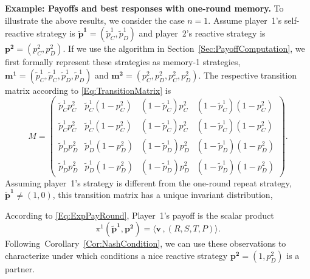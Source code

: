 \documentclass[9pt,twoside,lineno]{pnas-new}
\theoremstyle{plainCl1}
\theoremstyle{plainCl2}
\begin{document}
\noindent
{\bf Example: Payoffs and best responses with one-round memory.}
To illustrate the above results, we consider the case $n\!=\!1$. 
Assume player~1's self-reactive strategy is $\mathbf{\tilde p^1} \!=\! (\tilde p_C^1, \tilde p_D^1)$ and player~2's reactive strategy is $\mathbf{p^2} \!=\! (p^2_C, p^2_D)$. 
If we use the algorithm in Section~\ref{Sec:PayoffComputation}, we first formally represent these strategies as memory-1 strategies, $\mathbf{m^1} = (\tilde p_C^1, \tilde p_C^1,  \tilde p_D^1,  \tilde p_D^1)$ and $\mathbf{m^2} = (p_C^2, p_D^2,  p_C^2,  p_D^2)$.
The respective transition matrix according to \eqref{Eq:TransitionMatrix} is
\begin{equation} \label{Eq:TransitionM1}
M=\left(
\begin{array}{cccc}
\tilde p^1_C p^2_C	&\tilde p^1_C(1\!-\!p^2_C)	&(1\!-\!\tilde p^1_C)p^2_C	&(1\!-\!\tilde p^1_C)(1\!-\!p^2_C)\\
\tilde p^1_C p^2_C	&\tilde p^1_C(1\!-\!p^2_C)	&(1\!-\!\tilde p^1_C)p^2_C	&(1\!-\!\tilde p^1_C)(1\!-\!p^2_C)\\
\tilde p^1_D p^2_D	&\tilde p^1_D(1\!-\!p^2_D)	&(1\!-\!\tilde p^1_D)p^2_D	&(1\!-\!\tilde p^1_D)(1\!-\!p^2_D)\\
\tilde p^1_D p^2_D	&\tilde p^1_D(1\!-\!p^2_D)	&(1\!-\!\tilde p^1_D)p^2_D	&(1\!-\!\tilde p^1_D)(1\!-\!p^2_D)
\end{array}
\right).
\end{equation}
Assuming player~1's strategy is different from the one-round repeat strategy, $\mathbf{\tilde p^1} \!\neq\! (1,0)$, this transition matrix has a unique invariant distribution,
{\begin{center}
\end{center}}
\noindent
According to \eqref{Eq:ExpPayRound}, Player~1's payoff is the scalar product 
\begin{equation} \label{Eq:PayExample}
\pi^1(\mathbf{\tilde p^1},\mathbf{p^2})=\big\langle\mathbf{v}\, , (R,S,T,P)\big\rangle.
\end{equation} 
Following~Corollary~\ref{Cor:NashCondition}, we can use these observations to characterize under which conditions a nice reactive strategy $\mathbf{p^2}\!=\!(1,p^2_D)$ is a partner. 
\end{document}
